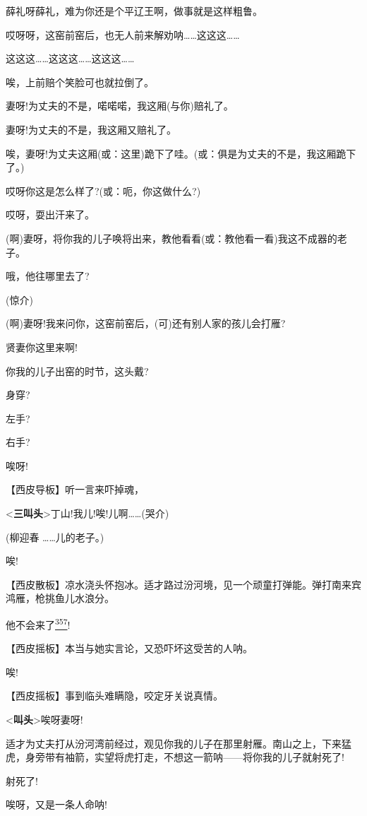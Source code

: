 薛礼呀薛礼，难为你还是个平辽王啊，做事就是这样粗鲁。

哎呀呀，这窑前窑后，也无人前来解劝呐\ldots{}\ldots{}这这这\ldots{}\ldots{}

这这这\ldots{}\ldots{}这这这\ldots{}\ldots{}这这这\ldots{}\ldots{}

唉，上前赔个笑脸可也就拉倒了。

妻呀!为丈夫的不是，喏喏喏，我这厢(与你)赔礼了。

妻呀!为丈夫的不是，我这厢又赔礼了。

唉，妻呀!为丈夫这厢(或：这里)跪下了哇。(或：俱是为丈夫的不是，我这厢跪下了。)

哎呀你这是怎么样了?(或：呃，你这做什么?)

哎呀，耍出汗来了。

(啊)妻呀，将你我的儿子唤将出来，教他看看(或：教他看一看)我这不成器的老子。

哦，他往哪里去了?

(惊介)

(啊)妻呀!我来问你，这窑前窑后，(可)还有别人家的孩儿会打雁?

贤妻你这里来啊!

你我的儿子出窑的时节，这头戴?

身穿?

左手?

右手?

唉呀!

【西皮导板】听一言来吓掉魂，

\textless{}\textbf{三叫头}\textgreater{}丁山!我儿!唉!儿啊\ldots{}\ldots{}(哭介)

(柳迎春 \ldots{}\ldots{}儿的老子。)

唉!

【西皮散板】凉水浇头怀抱冰。适才路过汾河境，见一个顽童打弹能。弹打南来宾鸿雁，枪挑鱼儿水浪分。

他不会来了\protect\hyperlink{fn357}{\textsuperscript{357}}!

【西皮摇板】本当与她实言论，又恐吓坏这受苦的人呐。

唉!

【西皮摇板】事到临头难瞒隐，咬定牙关说真情。

\textless{}\textbf{叫头}\textgreater{}唉呀妻呀!

适才为丈夫打从汾河湾前经过，观见你我的儿子在那里射雁。南山之上，下来猛虎，身旁带有袖箭，实望将虎打走，不想这一箭呐------将你我的儿子就射死了!

射死了!

唉呀，又是一条人命呐!

